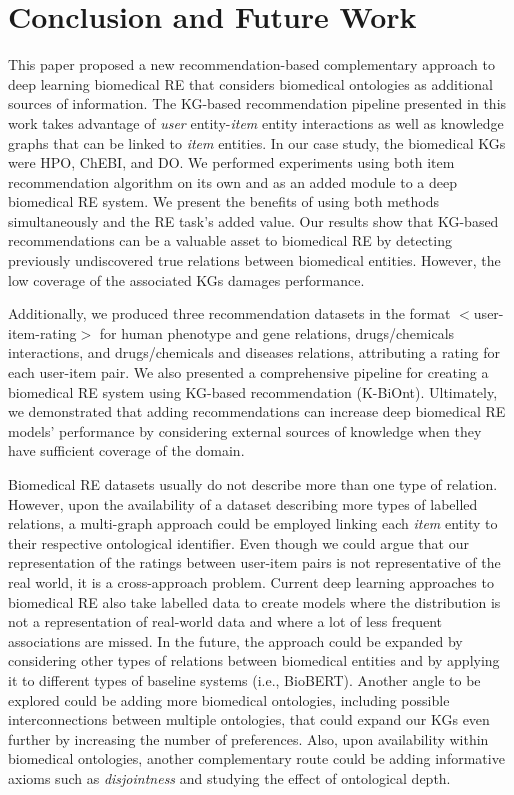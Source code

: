 \section{Conclusion and Future Work}

This paper proposed a new recommendation-based complementary approach to deep learning biomedical RE that considers biomedical ontologies as additional sources of information. The KG-based recommendation pipeline presented in this work takes advantage of \textit{user} entity-\textit{item} entity interactions as well as knowledge graphs that can be linked to \textit{item} entities. In our case study, the biomedical KGs were HPO, ChEBI, and DO. We performed experiments using both item recommendation algorithm on its own and as an added module to a deep biomedical RE system. We present the benefits of using both methods simultaneously and the RE task's added value. Our results show that KG-based recommendations can be a valuable asset to biomedical RE by detecting previously undiscovered true relations between biomedical entities. However, the low coverage of the associated KGs damages performance.

Additionally, we produced three recommendation datasets in the format $<$user-item-rating$>$ for human phenotype and gene relations, drugs/chemicals interactions, and drugs/chemicals and diseases relations, attributing a rating for each user-item pair. We also presented a comprehensive pipeline for creating a biomedical RE system using KG-based recommendation (K-BiOnt). Ultimately, we demonstrated that adding recommendations can increase deep biomedical RE models' performance by considering external sources of knowledge when they have sufficient coverage of the domain.

Biomedical RE datasets usually do not describe more than one type of relation. However, upon the availability of a dataset describing more types of labelled relations, a multi-graph approach could be employed linking each \textit{item} entity to their respective ontological identifier. Even though we could argue that our representation of the ratings between user-item pairs is not representative of the real world, it is a cross-approach problem. Current deep learning approaches to biomedical RE also take labelled data to create models where the distribution is not a representation of real-world data and where a lot of less frequent associations are missed. 
In the future, the approach could be expanded by considering other types of relations between biomedical entities and by applying it to different types of baseline systems (i.e., BioBERT). Another angle to be explored could be adding more biomedical ontologies, including possible interconnections between multiple ontologies, that could expand our KGs even further by increasing the number of preferences. Also, upon availability within biomedical ontologies, another complementary route could be adding informative axioms such as \textit{disjointness} and studying the effect of ontological depth.